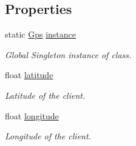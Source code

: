 \subsection*{Properties}
\begin{DoxyCompactItemize}
\item 
static \mbox{\hyperlink{class_gps}{Gps}} \mbox{\hyperlink{class_gps_aad45dcf4709abee18351879d03668108}{instance}}
\begin{DoxyCompactList}\small\item\em Global Singleton instance of class. \end{DoxyCompactList}\item 
float \mbox{\hyperlink{class_gps_ad60149a07acd29cb3a7084143edbbf62}{latitude}}
\begin{DoxyCompactList}\small\item\em Latitude of the client. \end{DoxyCompactList}\item 
float \mbox{\hyperlink{class_gps_a49d352c8f5b59c35272483e6aef7aea2}{longitude}}
\begin{DoxyCompactList}\small\item\em Longitude of the client. \end{DoxyCompactList}\end{DoxyCompactItemize}
